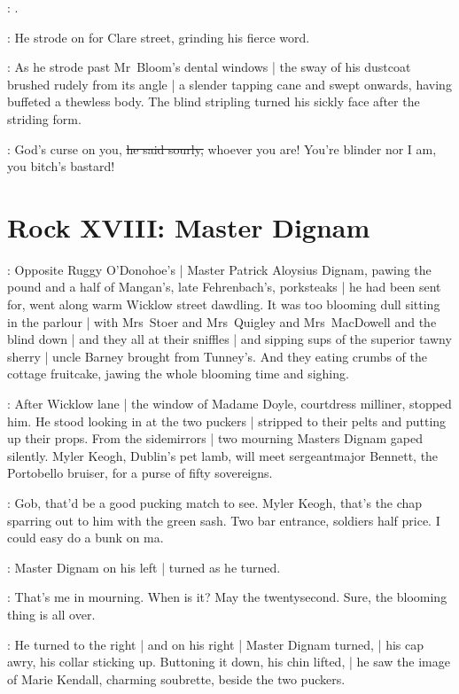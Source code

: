 \cashel:
.

:
He strode on for Clare street,
grinding his fierce word.

:
As he strode past Mr~Bloom's dental windows |
the sway of his dustcoat brushed rudely from its angle |
a slender tapping cane and swept onwards,
having buffeted a thewless body.
The blind stripling turned his sickly face after the striding form.

\stripling:
God's curse on you,
\sout{he said sourly,}
whoever you are!
You're blinder nor I am,%
you bitch's bastard!


\section*{Rock XVIII: Master Dignam}


:
Opposite Ruggy O'Donohoe's |
Master Patrick Aloysius Dignam,
pawing the pound and a half of Mangan's,
late Fehrenbach's,
porksteaks |
he had been sent for,
went along warm Wicklow street dawdling.
It was too blooming dull sitting in the parlour |
with Mrs~Stoer and Mrs~Quigley and Mrs~MacDowell
and the blind down |
and they all at their sniffles |
and sipping sups of the superior tawny sherry |
uncle Barney brought from Tunney's.
And they eating crumbs of the cottage fruitcake,
jawing the whole blooming time and sighing.

:
After Wicklow lane |
the window of Madame Doyle,
courtdress milliner,
stopped him.
He stood looking in at the two puckers |
stripped to their pelts and putting up their props.
From the sidemirrors |
two mourning Masters Dignam gaped silently.
Myler Keogh,
Dublin's pet lamb,
will meet sergeantmajor Bennett,
the Portobello bruiser,
for a purse of fifty sovereigns.

\masterdignam:
Gob, that'd be a good pucking match to see.
Myler Keogh, that's the chap sparring out to him with the green sash.
Two bar entrance, soldiers half price.
I could easy do a bunk on ma.

:
Master Dignam on his left |
turned as he turned.

\masterdignam:
That's me in mourning.
When is it?
May the twentysecond.
Sure, the blooming thing is all over.

:
He turned to the right |
and on his right |
Master Dignam turned, |
his cap awry,
his collar sticking up.
Buttoning it down,
his chin lifted, |
he saw the image of Marie Kendall,
charming soubrette,
beside the two puckers.


